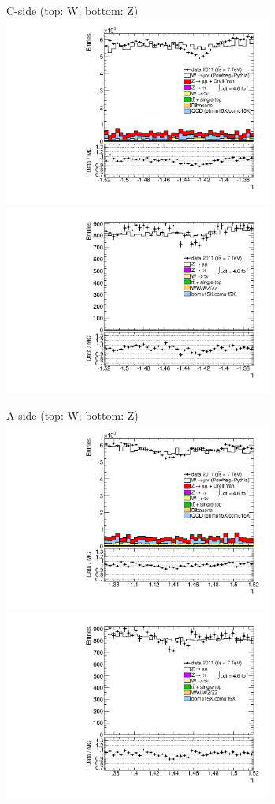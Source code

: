 {

\colb[T]

C-side (top: W; bottom: Z)
\centering
\includegraphics[width=0.66\textwidth]{dates/20130306/figures/etaphi/W_7_C_stack_l_eta_NEG} \\
\includegraphics[width=0.66\textwidth]{dates/20130306/figures/etaphi/Z_7_C_stack_lN_eta_ALL.pdf}

A-side (top: W; bottom: Z)
\centering
\includegraphics[width=0.66\textwidth]{dates/20130306/figures/etaphi/W_7_A_stack_l_eta_NEG} \\
\includegraphics[width=0.66\textwidth]{dates/20130306/figures/etaphi/Z_7_A_stack_lN_eta_ALL.pdf} 

\cole
}


